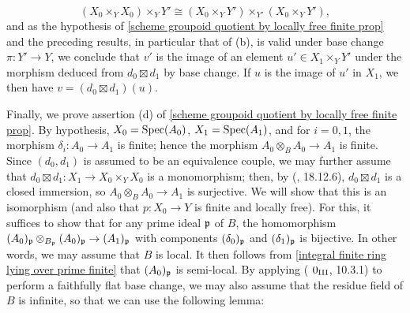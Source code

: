 \[(X_0\times_YX_0)\times_YY'\cong(X_0\times_YY')\times_{Y'}(X_0\times_YY'),\]
and as the hypothesis of \cref{scheme groupoid quotient by locally free finite prop} and the preceding results, in particular that of (b), is valid under base change $\pi:Y'\to Y$, we conclude that $v'$ is the image of an element $u'\in X_1\times_YY'$ under the morphism deduced from $d_0\boxtimes d_1$ by base change. If $u$ is the image of $u'$ in $X_1$, we then have $v=(d_0\boxtimes d_1)(u)$.\par
Finally, we prove assertion (d) of \cref{scheme groupoid quotient by locally free finite prop}. By hypothesis, $X_0=\mathrm{Spec}(A_0)$, $X_1=\mathrm{Spec}(A_1)$, and for $i=0,1$, the morphism $\delta_i:A_0\to A_1$ is finite; hence the morphism $A_0\otimes_BA_0\to A_1$ is finite. Since $(d_0,d_1)$ is assumed to be an equivalence couple, we may further assume that $d_0\boxtimes d_1:X_1\to X_0\times_YX_0$ is a monomorphism; then, by (\cite{EGA4-4}, 18.12.6), $d_0\boxtimes d_1$ is a closed immersion, so $A_0\otimes_BA_0\to A_1$ is surjective. We will show that this is an isomorphism (and also that $p:X_0\to Y$ is finite and locally free). For this, it suffices to show that for any prime ideal $\mathfrak{p}$ of $B$, the homomorphism $(A_0)_{\mathfrak{p}}\otimes_{B_{\mathfrak{p}}}(A_0)_{\mathfrak{p}}\to (A_1)_{\mathfrak{p}}$ with components $(\delta_0)_{\mathfrak{p}}$ and $(\delta_1)_{\mathfrak{p}}$ is bijective. In other words, we may assume that $B$ is local. It then follows from \cref{integral finite ring lying over prime finite} that $(A_0)_{\mathfrak{p}}$ is semi-local. By applying (\cite{EGA3} $0_{\Rmnum{3}}$, 10.3.1) to perform a faithfully flat base change, we may also assume that the residue field of $B$ is infinite, so that we can use the following lemma:

